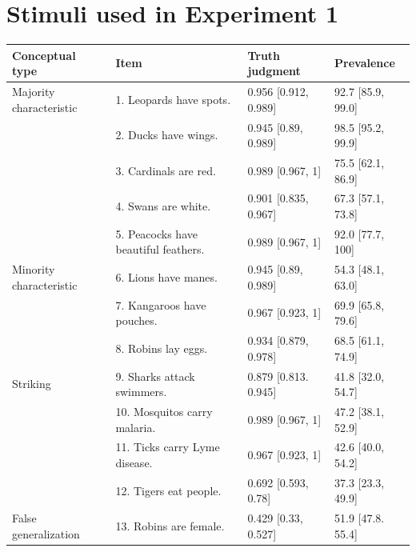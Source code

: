 \documentclass[10pt,letterpaper]{article}
\begin{document}
\section{Stimuli used in Experiment 1}
\label{sec:appendix}	

\begin{table}[h]
\begin{tabular}{| l | l | p{3.5cm} | p{3.5cm} |}
\hline
Conceptual type & Item & Truth judgment & Prevalence \\
\hline \hline
Majority characteristic       & 1. Leopards have spots.    &0.956	[0.912, 0.989] & 92.7 [85.9, 99.0]\\
                                          & 2. Ducks have wings.                       &0.945	[0.89, 0.989] & 98.5 [95.2, 99.9]\\
                                          & 3. Cardinals are red.                       &0.989	[0.967, 1] & 75.5 [62.1, 86.9]\\
                                          & 4. Swans are white.                       &0.901	[0.835, 0.967] & 67.3 [57.1, 73.8] \\
                                          & 5. Peacocks have beautiful feathers. &  0.989	[0.967, 1] & 92.0 [77.7, 100] \\
Minority characteristic       & 6. Lions have manes.       &0.945	[0.89, 0.989] & 54.3 [48.1, 63.0]\\
                                          & 7. Kangaroos have pouches.                        &0.967 [0.923, 1]& 69.9 [65.8, 79.6]\\
                                          & 8. Robins lay eggs.                        &0.934	[0.879, 0.978]& 68.5 [61.1, 74.9]\\
Striking                      & 9. Sharks attack swimmers. &0.879	[0.813. 0.945] & 41.8 [32.0, 54.7]\\
                                  & 10. Mosquitos carry malaria.                        &0.989	[0.967, 1] & 47.2 [38.1,	 52.9]\\
                                  & 11. Ticks carry Lyme disease.                        &0.967	[0.923, 1] &  42.6 [40.0, 54.2]\\
                                  & 12. Tigers eat people.                        &0.692	[0.593, 0.78] & 37.3 [23.3, 49.9]\\
False generalization & 13. Robins are female.      &0.429	[0.33, 0.527] & 51.9 [47.8. 55.4]\\

\end{tabular}
\end{table}
\end{document}
